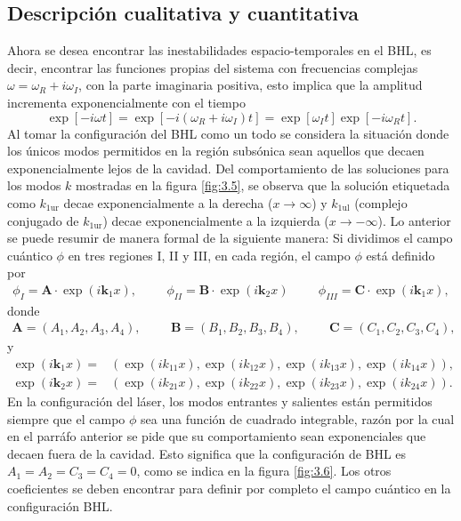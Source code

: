 \subsection{Descripci\'{o}n cualitativa y cuantitativa}
Ahora se desea encontrar las inestabilidades espacio-temporales en el BHL, es decir, encontrar las funciones propias del sistema con frecuencias complejas $\omega=\omega_R+i\omega_I$, con la parte imaginaria positiva, esto implica que la amplitud incrementa exponencialmente con el tiempo
\begin{equation}
\exp[-i\omega t]=\exp[-i(\omega_R+i\omega_I)t]=\exp[\omega_It]\exp[-i\omega_Rt].
\end{equation}
Al tomar la configuraci\'{o}n del BHL como un todo se considera la situación donde los únicos modos permitidos en la regi\'{o}n subs\'{o}nica sean aquellos que decaen exponencialmente lejos de la cavidad. Del comportamiento de las soluciones para los modos $k$ mostradas en la figura \ref{fig:3.5}, se observa que la soluci\'{o}n etiquetada como $k_{1\text{ur}}$ decae exponencialmente a la derecha ($x\rightarrow \infty$) y $k_{1\text{ul}}$ (complejo conjugado de $k_{\text{1ur}}$) decae exponencialmente a la izquierda  ($x\rightarrow -\infty$).
Lo anterior se puede resumir de manera formal de la siguiente manera: Si dividimos el campo cu\'{a}ntico $\phi$ en tres regiones I, II y III, en cada regi\'{o}n, el campo $\phi$ est\'{a} definido por
\begin{align}
\phi_I=\textbf{A}\cdot \exp(i\textbf{k}_1x),\hspace{1cm}\phi_{II}=\textbf{B}\cdot \exp(i\textbf{k}_2x)\hspace{1cm}\phi_{III}=\textbf{C}\cdot \exp(i\textbf{k}_1x),
\end{align}
donde
\begin{align}
\textbf{A}=(A_1,A_2,A_3,A_4),\hspace{1cm}\textbf{B}=(B_1,B_2,B_3,B_4),\hspace{1cm}\textbf{C}=(C_1,C_2,C_3,C_4),
\end{align}
y
\begin{align}
\nonumber \exp(i\textbf{k}_1x)=&(\exp(ik_{11}x),\exp(ik_{12}x),\exp(ik_{13}x),\exp(ik_{14}x)),\\
\exp(i\textbf{k}_2x)=&(\exp(ik_{21}x),\exp(ik_{22}x),\exp(ik_{23}x),\exp(ik_{24}x)).
\end{align}
En la configuraci\'{o}n del l\'{a}ser, los modos entrantes y salientes están permitidos siempre que el campo $\phi$ sea una funci\'{o}n de cuadrado integrable, raz\'{o}n  por la cual en el parr\'{a}fo anterior se pide que su comportamiento sean exponenciales que decaen fuera de la cavidad. Esto significa que la configuración de BHL es
$A_1 = A_2 = C_3 = C_4 = 0$, como se indica en la figura \ref{fig:3.6}. Los otros coeficientes se deben encontrar para definir por completo el campo cu\'{a}ntico en la configuraci\'{o}n BHL.


